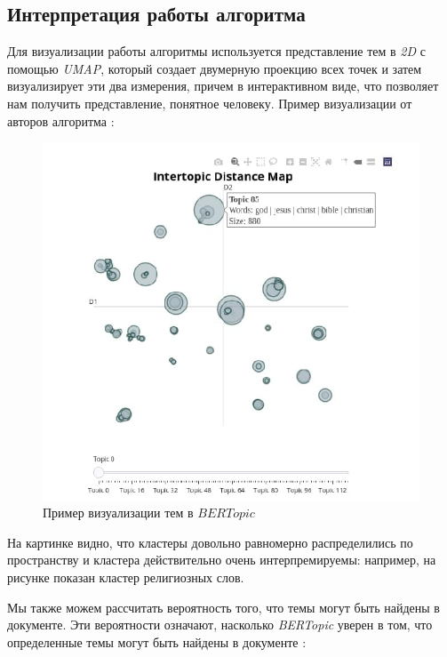 \subsection{Интерпретация работы алгоритма} 

Для визуализации работы алгоритмы используется представление тем в 
\textit{2D} с помощью \textit{UMAP}, который создает двумерную проекцию всех точек и затем визуализирует эти два измерения, причем в интерактивном виде, что позволяет нам получить представление, понятное человеку. Пример визуализации от авторов алгоритма \cite{bib_4}:


\begin{figure}[H]
\centering
\includegraphics[scale=0.9]{pics/bertopic-visual-1.jpg}
\caption{Пример визуализации тем в $BERTopic$}
\end{figure}

На картинке видно, что кластеры довольно равномерно распределились по пространству и кластера действительно очень интерпремируемы: например, на рисунке показан кластер религиозных слов.

Мы также можем рассчитать вероятность того, что темы могут быть найдены в документе. Эти вероятности означают, насколько \textit{BERTopic} 
уверен в том, что определенные темы могут быть найдены в документе \cite{bib_4}:


